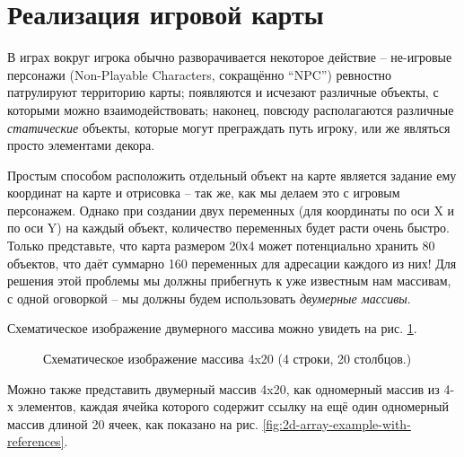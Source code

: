 \documentclass[../sparc.tex]{subfiles}
\begin{document}
\section{Реализация игровой карты}

В играх вокруг игрока обычно разворачивается некоторое действие -- не-игровые
персонажи (Non-Playable Characters, сокращённо ``NPC'') ревностно патрулируют
территорию карты; появляются и исчезают различные объекты, с которыми можно
взаимодействовать; наконец, повсюду располагаются различные \emph{статические}
объекты, которые могут преграждать путь игроку, или же являться просто
элементами декора.

Простым способом расположить отдельный объект на карте является задание ему
координат на карте и отрисовка -- так же, как мы делаем это с игровым
персонажем.  Однако при создании двух переменных (для координаты по оси X и по
оси Y) на каждый объект, количество переменных будет расти очень быстро.  Только
представьте, что карта размером 20х4 может потенциально хранить 80 объектов, что
даёт суммарно 160 переменных для адресации каждого из них!  Для решения этой
проблемы мы должны прибегнуть к уже известным нам массивам, с одной оговоркой --
мы должны будем использовать \emph{двумерные массивы}.

Схематическое изображение двумерного массива можно увидеть на
рис. \ref{fig:2d-array-example}.

\begin{figure}[ht]
  \centering
  \caption{Схематическое изображение массива 4x20 (4 строки, 20 столбцов.)}
  \label{fig:2d-array-example}
\end{figure}

Можно также представить двумерный массив 4x20, как одномерный массив из 4-х
элементов, каждая ячейка которого содержит ссылку на ещё один одномерный массив
длиной 20 ячеек, как показано на
рис. \ref{fig:2d-array-example-with-references}.
\end{document}
